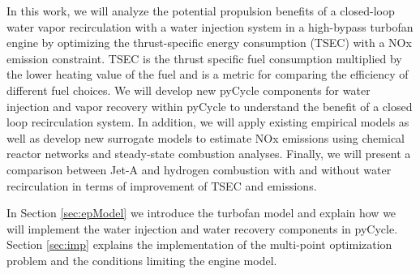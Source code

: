 \documentclass[conf]{new-aiaa}
\begin{document}
In this work, we will analyze the potential propulsion benefits of a closed-loop water vapor recirculation with a water injection system in a high-bypass turbofan engine by optimizing the thrust-specific energy consumption (TSEC) with a NOx emission constraint.
TSEC is the thrust specific fuel consumption multiplied by the lower heating value of the fuel and is a metric for comparing the efficiency of different fuel choices.
We will develop new pyCycle components for water injection and vapor recovery within pyCycle to understand the benefit of a closed loop recirculation system.
In addition, we will apply existing empirical models as well as develop new surrogate models to estimate NOx emissions using chemical reactor networks and steady-state combustion analyses.
Finally, we will present a comparison between Jet-A and hydrogen combustion with and without water recirculation in terms of improvement of TSEC and emissions.

In Section \ref{sec:epModel} we introduce the turbofan model and explain how we will implement the water injection and water recovery components in pyCycle.
Section \ref{sec:imp} explains the implementation of the multi-point optimization problem and the conditions limiting the engine model.
\end{document}
